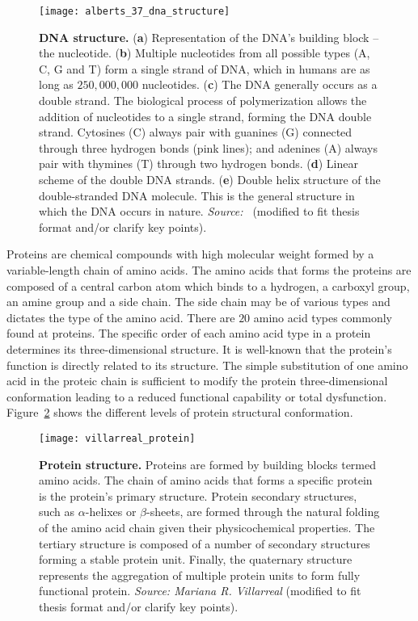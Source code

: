 \begin{figure}[h!]
\centering
\texttt{[image: alberts\_37\_dna\_structure]}
\caption[DNA structure]{\textbf{DNA structure.} (\textbf{a}) Representation of the DNA's building block -- the nucleotide. (\textbf{b}) Multiple nucleotides from all possible types (A, C, G and T) form a single strand of DNA, which in humans are as long as \approxy$250,000,000$ nucleotides. (\textbf{c}) The DNA generally occurs as a double strand. The biological process of polymerization allows the addition of nucleotides to a single strand, forming the DNA double strand. Cytosines (C) always pair with guanines (G) connected through three hydrogen bonds (pink lines); and adenines (A) always pair with thymines (T) through two hydrogen bonds. (\textbf{d}) Linear scheme of the double DNA strands. (\textbf{e}) Double helix structure of the double-stranded DNA molecule. This is the general structure in which the DNA occurs in nature. \emph{Source:~\cite{alberts2007}} (modified to fit thesis format and/or clarify key points).}
\label{fig:alberts_dna_structure}
\end{figure}

Proteins are chemical compounds with high molecular weight formed by a variable-length chain of amino acids. The amino acids that forms the proteins are composed of a central carbon atom which binds to a hydrogen, a carboxyl group, an amine group and a side chain. The side chain may be of various types and dictates the type of the amino acid. There are $20$ amino acid types commonly found at proteins. The specific order of each amino acid type in a protein determines its three-dimensional structure. It is well-known that the protein's function is directly related to its structure. The simple substitution of one amino acid in the proteic chain is sufficient to modify the protein three-dimensional conformation leading to a reduced functional capability or total dysfunction. Figure~\ref{fig:villarreal_protein} shows the different levels of protein structural conformation.

\begin{figure}[h!]
\centering
\texttt{[image: villarreal\_protein]}
\caption[Protein structure]{\textbf{Protein structure.} Proteins are formed by building blocks termed amino acids. The chain of amino acids that forms a specific protein is the protein's primary structure. Protein secondary structures, such as $\alpha$-helixes or $\beta$-sheets, are formed through the natural folding of the amino acid chain given their physicochemical properties. The tertiary structure is composed of a number of secondary structures forming a stable protein unit. Finally, the quaternary structure represents the aggregation of multiple protein units to form fully functional protein. \emph{Source: Mariana R. Villarreal} (modified to fit thesis format and/or clarify key points).}
\label{fig:villarreal_protein}
\end{figure}

